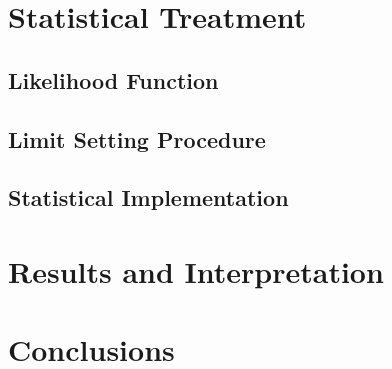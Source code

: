 \documentclass{outhesis}
\begin{document}
\chapter{Statistical Treatment}\label{chap:stat}
\graphicspath{{figures/stat/}}

\section{Likelihood Function}

\section{Limit Setting Procedure}

\section{Statistical Implementation}


\chapter{Results and Interpretation}\label{chap:res}
\graphicspath{{figures/res/}}


\chapter{Conclusions}\label{chap:concl}
\graphicspath{{figures/concl/}}


\clearpage

\appendix

\end{document}
